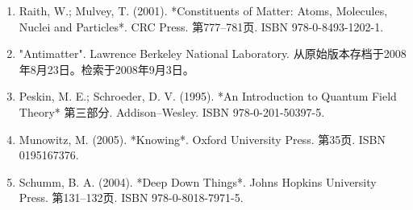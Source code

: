 \begin{enumerate}
\item Raith, W.; Mulvey, T. (2001). *Constituents of Matter: Atoms, Molecules, Nuclei and Particles*. CRC Press. 第777–781页. ISBN 978-0-8493-1202-1.
\item "Antimatter". Lawrence Berkeley National Laboratory. 从原始版本存档于2008年8月23日。检索于2008年9月3日。
\item Peskin, M. E.; Schroeder, D. V. (1995). *An Introduction to Quantum Field Theory* 第三部分. Addison–Wesley. ISBN 978-0-201-50397-5.
\item Munowitz, M. (2005). *Knowing*. Oxford University Press. 第35页. ISBN 0195167376.
\item Schumm, B. A. (2004). *Deep Down Things*. Johns Hopkins University Press. 第131–132页. ISBN 978-0-8018-7971-5.
\end{enumerate}